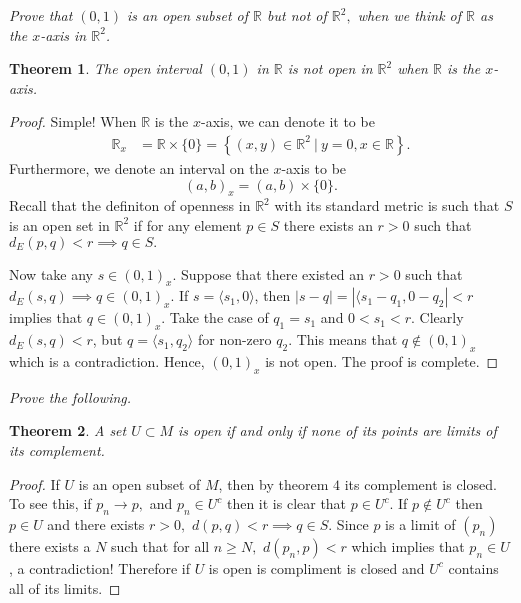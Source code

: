 \documentclass[letter]{article}
\newtheorem{theorem}{Theorem}
\newenvironment{menumerate}{%
  \edef\backupindent{\the\parindent}%
  \enumerate%
  \setlength{\parindent}{\backupindent}%
}{\endenumerate}
\begin{document}
\begin{menumerate}
		\item \textit{Prove that $(0,1)$ is an open subset of $\mathbb{R}$ but 
			not of $\mathbb{R}^2,$ when we think of $\mathbb{R}$ as the $x$-axis in $\mathbb {R}^2$.} 
			\begin{theorem}
				The open interval $(0,1)$ in $\mathbb{R}$ is not open in $\mathbb{R}^2$ when $\mathbb{R}$ is the $x$-axis.
			\end{theorem}
			\begin{proof}
				Simple! When $\mathbb{R}$ is the $x$-axis, we can denote it to be 
				\begin{equation}
					\begin{aligned}
						\mathbb{R}_x &=  \mathbb{R} \times \{0\} 
							= \left\{(x,y) \in \mathbb{R}^2\ | \ y = 0, x \in \mathbb{R} \right\}.
					\end{aligned}
				\end{equation}
				Furthermore, we denote an interval on the $x$-axis to be 
				\begin{equation}
					(a,b)_x = (a,b) \times \{0\}.
				\end{equation}
				Recall that the definiton of openness in $\mathbb{R}^2$ with its standard metric is such that $S$ is an open set in $\mathbb{R}^2$ if for any element $p\in S$ there exists an $r > 0$ such that $d_E(p,q) <r \implies q \in S.$ 

				Now take any $s \in (0,1)_x.$ Suppose that there existed an $r >0$ such that $d_E(s,q) \implies q \in (0,1)_x$. If $s = \langle s_1, 0 \rangle$, then $|s - q| =  |\langle s_1 - q_1, 0 - q_2| < r$ implies that $q \in (0,1)_x$. Take the case of $q_1 = s_1$ and $0 < s_1 < r$. Clearly $d_E(s,q) < r$, but $q = \langle s_1, q_2 \rangle$ for non-zero $q_2$. This means that $q\notin (0,1)_x$ which is a contradiction. Hence, $(0,1)_x$ is not open. The proof is complete.
			\end{proof}


		\setcounter{enumi}{25}
		\item \textit{Prove the following.}
			\begin{theorem}
			 	A set $U \subset M$ is open if and only if none of its points are limits of its complement.
			 \end{theorem} 
			 \begin{proof}
			 If $U$ is an open subset of $M$, then by theorem $4$ its complement is closed. To see this, if $p_n \to p,$ and $p_n \in U^c$ then it is clear that $p \in U^c.$ If $p \notin U^c$ then $p \in U$ and there exists $r >0,$ $d(p,q) < r \implies q \in S.$ Since $p$ is a limit of $(p_n)$ there exists a $N$ such that for all $n \geq N,$ $d(p_n,p) <r$ which implies that $p_n \in U$, a contradiction! Therefore if $U$ is open is compliment is closed and $U^c$ contains all of its limits.


\end{proof}
\end{menumerate}
\end{document}
